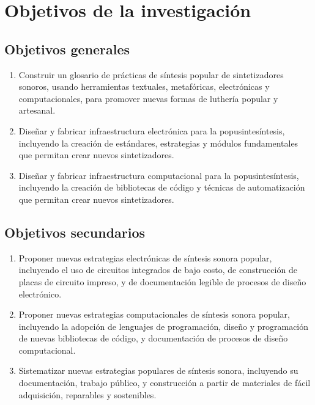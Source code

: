 \documentclass[../proyecto.tex]{subfiles}
\begin{document}
\section{Objetivos de la investigación}


\subsection{Objetivos generales}

\begin{enumerate}
    \item Construir un glosario de prácticas de síntesis popular de sintetizadores sonoros, usando herramientas textuales, metafóricas, electrónicas y computacionales, para promover nuevas formas de luthería popular y artesanal.
    \item Diseñar y fabricar infraestructura electrónica para la popusintesíntesis, incluyendo la creación de estándares, estrategias y módulos fundamentales que permitan crear nuevos sintetizadores.
    \item  Diseñar y fabricar infraestructura computacional para la popusintesíntesis, incluyendo la creación de bibliotecas de código y técnicas de automatización que permitan crear nuevos sintetizadores.
\end{enumerate}

\subsection{Objetivos secundarios}

\begin{enumerate}
    \item Proponer nuevas estrategias electrónicas de síntesis sonora popular, incluyendo el uso de circuitos integrados de bajo costo, de construcción de placas de circuito impreso, y de documentación legible de procesos de diseño electrónico.
    \item Proponer nuevas estrategias computacionales de síntesis sonora popular, incluyendo la adopción de lenguajes de programación, diseño y programación de nuevas bibliotecas de código, y documentación de procesos de diseño computacional.
    \item Sistematizar nuevas estrategias populares de síntesis sonora, incluyendo su documentación, trabajo público, y construcción a partir de materiales de fácil adquisición, reparables y sostenibles.
\end{enumerate}
\end{document}
